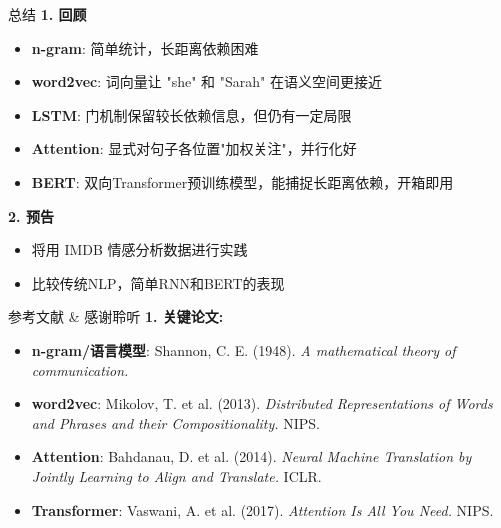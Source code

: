 \documentclass{beamer}
\begin{document}
\begin{frame}{总结}
  \textbf{1. 回顾}
  \begin{itemize}
    \item \textbf{n-gram}: 简单统计，长距离依赖困难
    \item \textbf{word2vec}: 词向量让 "she" 和 "Sarah" 在语义空间更接近
    \item \textbf{LSTM}: 门机制保留较长依赖信息，但仍有一定局限
    \item \textbf{Attention}: 显式对句子各位置"加权关注"，并行化好
    \item \textbf{BERT}: 双向Transformer预训练模型，能捕捉长距离依赖，开箱即用

  \end{itemize}

  \textbf{2. 预告}
  \begin{itemize}
    \item 将用 IMDB 情感分析数据进行实践
    \item 比较传统NLP，简单RNN和BERT的表现
  \end{itemize}
\end{frame}

\begin{frame}{参考文献 \& 感谢聆听}
  \textbf{1. 关键论文:}
  \begin{itemize}
    \item \textbf{n-gram/语言模型}: Shannon, C. E. (1948). \emph{A mathematical theory of communication.}
    \item \textbf{word2vec}: Mikolov, T. et al. (2013). \emph{Distributed Representations of Words and Phrases and their Compositionality.} NIPS.
    \item \textbf{Attention}: Bahdanau, D. et al. (2014). \emph{Neural Machine Translation by Jointly Learning to Align and Translate.} ICLR.
    \item \textbf{Transformer}: Vaswani, A. et al. (2017). \emph{Attention Is All You Need.} NIPS.
  \end{itemize}
\end{frame}
\end{document}

